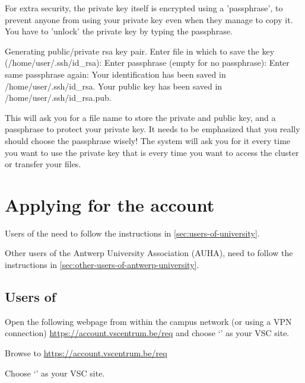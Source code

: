   For extra security, the private key itself is encrypted using a 'passphrase',
  to prevent anyone from using your private key even when they manage to copy
  it. You have to 'unlock' the private key by typing the passphrase.

  \begin{prompt}
  Generating public/private rsa key pair.
  Enter file in which to save the key (/home/user/.ssh/id_rsa):
  Enter passphrase (empty for no passphrase):
  Enter same passphrase again:
  Your identification has been saved in /home/user/.ssh/id_rsa.
  Your public key has been saved in /home/user/.ssh/id_rsa.pub.
  \end{prompt}

  This will ask you for a file name to store the private and public key, and a
  passphrase to protect your private key. It needs to be emphasized that you
  really should choose the passphrase wisely! The system will ask you for it
  every time you want to use the private key that is every time you want to
  access the cluster or transfer your files.


\fi

\section{Applying for the account}
\label{sec:applying-for-the-account}

Users of the \university need to follow the instructions in \autoref{sec:users-of-university}.

\ifantwerpen
Other users of the Antwerp University Association (AUHA), need to follow the
instructions in \autoref{sec:other-users-of-antwerp-university}.
\fi

\subsection{Users of \university}
\label{sec:users-of-university}

Open the following webpage from within the \university campus network (or using a VPN
connection) \url{https://account.vscentrum.be/req} and choose `\sitename' as your VSC
site.

Browse to \url{https://account.vscentrum.be/req}

Choose `\sitename' as your VSC site.

